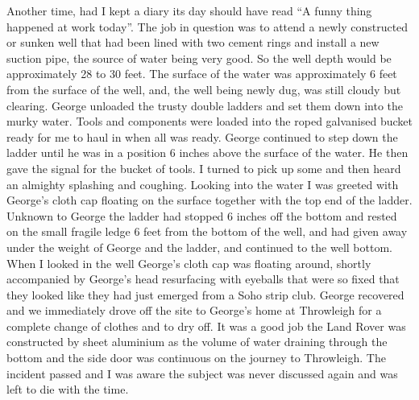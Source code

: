 Another time, had I kept a diary its day should have read ``A funny thing
happened at work today''. The job in question was to attend a newly constructed
or sunken well that had been lined with two cement rings and install a new
suction pipe, the source of water being very good. So the well depth would be
approximately 28 to 30 feet. The surface of the water was approximately 6 feet
from the surface of the well, and, the well being newly dug, was still cloudy
but clearing. George unloaded the trusty double ladders and set them down into
the murky water. Tools and components were loaded into the roped galvanised
bucket ready for me to haul in when all was ready. George continued to step
down the ladder until he was in a position 6 inches above the surface of the
water. He then gave the signal for the bucket of tools. I turned to pick up
some and then heard an almighty splashing and coughing. Looking into the water
I was greeted with George's cloth cap floating on the surface together with the
top end of the ladder. Unknown to George the ladder had stopped 6 inches off
the bottom and rested on the small fragile ledge 6 feet from the bottom of the
well, and had given away under the weight of George and the ladder, and
continued to the well bottom. When I looked in the well George's cloth cap was
floating around, shortly accompanied by George's head resurfacing with eyeballs
that were so fixed that they looked like they had just emerged from a Soho
strip club. George recovered and we immediately drove off the site to George's
home at Throwleigh for a complete change of clothes and to dry off. It was a
good job the Land Rover was constructed by sheet aluminium as the volume of
water draining through the bottom and the side door was continuous on the
journey to Throwleigh. The incident passed and I was aware the subject was
never discussed again and was left to die with the time.


